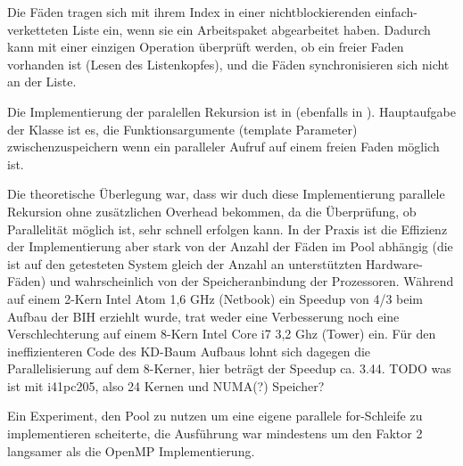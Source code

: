 Die Fäden tragen sich mit ihrem Index in einer nichtblockierenden einfach-verketteten Liste ein, wenn sie ein Arbeitspaket abgearbeitet haben. Dadurch kann mit einer einzigen Operation überprüft werden, ob ein freier Faden vorhanden ist (Lesen des Listenkopfes), und die Fäden synchronisieren sich nicht an der Liste.

Die Implementierung der paralellen Rekursion ist in  (ebenfalls in ). Hauptaufgabe der Klasse ist es, die Funktionsargumente (template Parameter) zwischenzuspeichern wenn ein paralleler Aufruf auf einem freien Faden möglich ist.

Die theoretische Überlegung war, dass wir duch diese Implementierung parallele Rekursion ohne zusätzlichen Overhead bekommen, da die Überprüfung, ob Parallelität möglich ist, sehr schnell erfolgen kann. In der Praxis ist die Effizienz der Implementierung aber stark von der Anzahl der Fäden im Pool abhängig (die ist auf den getesteten System gleich der Anzahl an unterstützten Hardware-Fäden) und wahrscheinlich von der Speicheranbindung der Prozessoren. Während auf einem 2-Kern Intel Atom 1,6 GHz (Netbook) ein Speedup von 4/3 beim Aufbau der BIH erziehlt wurde, trat weder eine Verbesserung noch eine Verschlechterung auf einem 8-Kern Intel Core i7 3,2 Ghz (Tower) ein. Für den ineffizienteren Code des KD-Baum Aufbaus lohnt sich dagegen die Parallelisierung auf dem 8-Kerner, hier beträgt der Speedup ca. 3.44. TODO was ist mit i41pc205, also 24 Kernen und NUMA(?) Speicher?

Ein Experiment, den Pool zu nutzen um eine eigene parallele for-Schleife zu implementieren scheiterte, die Ausführung war mindestens um den Faktor 2 langsamer als die OpenMP Implementierung.
